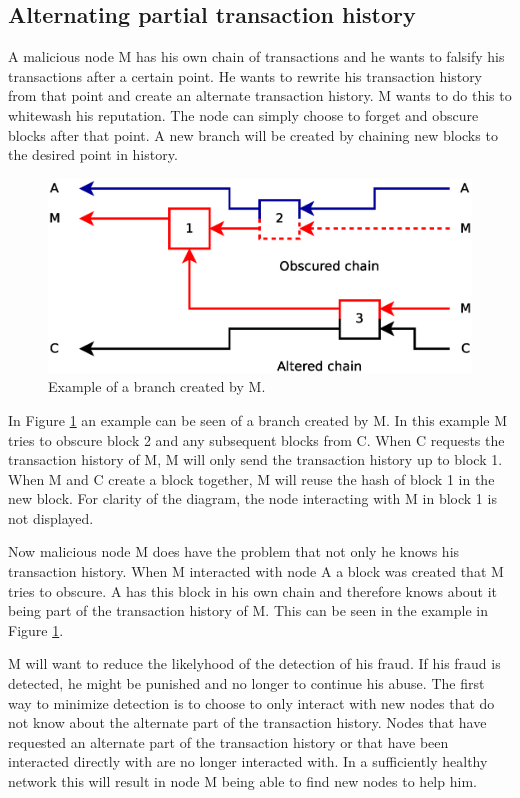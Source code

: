 \subsection{Alternating partial transaction history}
A malicious node M has his own chain of transactions
and he wants to falsify his transactions after a certain point.
He wants to rewrite his transaction history from that point and create an alternate transaction history.
M wants to do this to whitewash his reputation.
The node can simply choose to forget and obscure blocks after that point.
A new branch will be created by chaining new blocks to the desired point in history.

\begin{figure}
	\centerline{\includegraphics[scale=0.3]{problems/figs/branch.eps}}
	\caption{Example of a branch created by M.}
	\label{fig:problem-branch-obscure}
\end{figure}

In Figure \ref{fig:problem-branch-obscure} an example can be seen of a branch created by M.
In this example M tries to obscure block 2 and any subsequent blocks from C.
When C requests the transaction history of M, M will only send the transaction history up to block 1.
When M and C create a block together,
M will reuse the hash of block 1 in the new block.
For clarity of the diagram, the node interacting with M in block 1 is not displayed.

Now malicious node M does have the problem that not only he knows his transaction history.
When M interacted with node A a block was created that M tries to obscure.
A has this block in his own chain
and therefore knows about it being part of the transaction history of M.
This can be seen in the example in Figure \ref{fig:problem-branch-obscure}.

M will want to reduce the likelyhood of the detection of his fraud.
If his fraud is detected, he might be punished and no longer to continue his abuse.
The first way to minimize detection is to choose
to only interact with new nodes that do not know about the alternate part of the transaction history.
Nodes that have requested an alternate part of the transaction history
or that have been interacted directly with are no longer interacted with.
In a sufficiently healthy network this will result in node M being able to find new nodes to help him.

